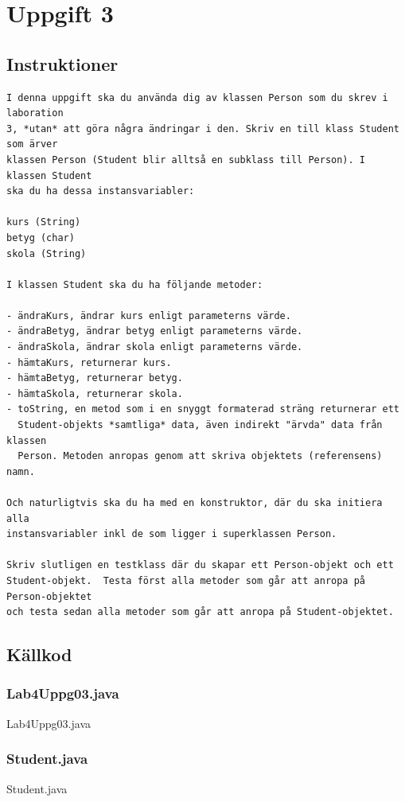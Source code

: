 \section{Uppgift 3}\label{sec:uppg03}

\subsection{Instruktioner}
\begin{Verbatim}[fontsize=\small]
I denna uppgift ska du använda dig av klassen Person som du skrev i laboration
3, *utan* att göra några ändringar i den. Skriv en till klass Student som ärver
klassen Person (Student blir alltså en subklass till Person). I klassen Student
ska du ha dessa instansvariabler:

kurs (String)
betyg (char)
skola (String)

I klassen Student ska du ha följande metoder:

- ändraKurs, ändrar kurs enligt parameterns värde.
- ändraBetyg, ändrar betyg enligt parameterns värde.
- ändraSkola, ändrar skola enligt parameterns värde.
- hämtaKurs, returnerar kurs.
- hämtaBetyg, returnerar betyg.
- hämtaSkola, returnerar skola.
- toString, en metod som i en snyggt formaterad sträng returnerar ett
  Student-objekts *samtliga* data, även indirekt "ärvda" data från klassen
  Person. Metoden anropas genom att skriva objektets (referensens) namn.

Och naturligtvis ska du ha med en konstruktor, där du ska initiera alla
instansvariabler inkl de som ligger i superklassen Person.

Skriv slutligen en testklass där du skapar ett Person-objekt och ett
Student-objekt.  Testa först alla metoder som går att anropa på Person-objektet
och testa sedan alla metoder som går att anropa på Student-objektet.
\end{Verbatim}


\subsection{Källkod}
\subsubsection{Lab4Uppg03.java}
\caption{Lab4Uppg03.java}
\label{src:uppg03}

\subsubsection{Student.java}
\caption{Student.java}
\label{src:student}

